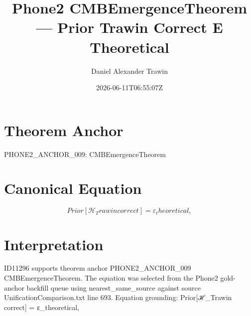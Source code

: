 \documentclass[11pt]{article}
\title{Phone2 CMBEmergenceTheorem — Prior Trawin Correct Ε Theoretical}
\author{Daniel Alexander Trawin}
\date{2026-06-11T06:55:07Z}
\begin{document}
\maketitle
\section*{Theorem Anchor}
PHONE2_ANCHOR_009: CMBEmergenceTheorem
\section*{Canonical Equation}
\[
Prior[ℋ_Trawin correct] = ε_theoretical,
\]
\section*{Interpretation}
ID11296 supports theorem anchor PHONE2_ANCHOR_009 CMBEmergenceTheorem. The equation was selected from the Phone2 gold-anchor backfill queue using nearest_same_source against source UnificationComparison.txt line 693. Equation grounding: Prior[ℋ_Trawin correct] = ε_theoretical,
\end{document}
